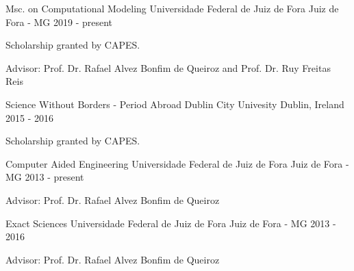 
\begin{list}

    \item

\end{list}



\begin{cventries}

  \cventry
    {Msc. on Computational Modeling} %
    {Universidade Federal de Juiz de Fora} %
    {Juiz de Fora - MG} %
    {2019 - present} %
    {
      \begin{cvitems} %
        \item {Scholarship granted by CAPES.}
        \item {Advisor: Prof. Dr. Rafael Alvez Bonfim de Queiroz and Prof. Dr. Ruy Freitas Reis}
      \end{cvitems}
    }
    
  \cventry
    {Science Without Borders - Period Abroad} %
    {Dublin City Univesity} %
    {Dublin, Ireland} %
    {2015 - 2016} %
    {
      \begin{cvitems} %
        \item {Scholarship granted by CAPES.}
      \end{cvitems}
    }

  \cventry
    {Computer Aided Engineering} %
    {Universidade Federal de Juiz de Fora} %
    {Juiz de Fora - MG} %
    {2013 - present} %
    {
      \begin{cvitems} %
        \item {Advisor: Prof. Dr. Rafael Alvez Bonfim de Queiroz}
      \end{cvitems}
    }
    
  \cventry
    {Exact Sciences} %
    {Universidade Federal de Juiz de Fora} %
    {Juiz de Fora - MG} %
    {2013 - 2016} %
    {
      \begin{cvitems} %
        \item {Advisor: Prof. Dr. Rafael Alvez Bonfim de Queiroz}
      \end{cvitems}
    }


\end{cventries}
